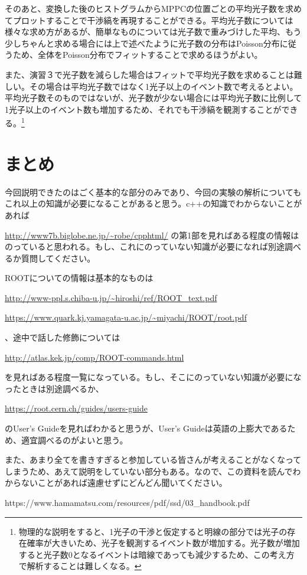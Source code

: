 \documentclass[uplatex,10pt,a4j]{jsarticle}
\begin{document}
そのあと、変換した後のヒストグラムからMPPCの位置ごとの平均光子数を求めてプロットすることで干渉縞を再現することができる。平均光子数については様々な求め方があるが、簡単なものについては光子数で重みづけした平均、もう少しちゃんと求める場合には上で述べたように光子数の分布はPoisson分布に従うため、全体をPoisson分布でフィットすることで求めるほうがよい。

また、演習３で光子数を減らした場合はフィットで平均光子数を求めることは難しい。その場合は平均光子数ではなく1光子以上のイベント数で考えるとよい。平均光子数そのものではないが、光子数が少ない場合には平均光子数に比例して1光子以上のイベント数も増加するため、それでも干渉縞を観測することができる。\footnote{物理的な説明をすると、1光子の干渉と仮定すると明線の部分では光子の存在確率が大きいため、光子を観測するイベント数が増加する。光子数が増加すると光子数0となるイベントは暗線であっても減少するため、この考え方で解析することは難しくなる。}

\section{まとめ}
\label{sec:lastsection}
今回説明できたのはごく基本的な部分のみであり、今回の実験の解析についてもこれ以上の知識が必要になることがあると思う。c++の知識でわからないことがあれば

\url{http://www7b.biglobe.ne.jp/~robe/cpphtml/}
の第1部を見ればある程度の情報はのっていると思われる。もし、これにのっていない知識が必要になれば別途調べるか質問してください。

ROOTについての情報は基本的なものは

\url{http://www-ppl.s.chiba-u.jp/~hiroshi/ref/ROOT_text.pdf}

\url{https://www.quark.kj.yamagata-u.ac.jp/~miyachi/ROOT/root.pdf}

、途中で話した修飾については

\url{http://atlas.kek.jp/comp/ROOT-commands.html}

を見ればある程度一覧になっている。もし、そこにのっていない知識が必要になったときは別途調べるか、

\url{https://root.cern.ch/guides/users-guide}

のUser's Guideを見ればわかると思うが、User's Guideは英語の上膨大であるため、適宜調べるのがよいと思う。

また、あまり全てを書きすぎると参加している皆さんが考えることがなくなってしまうため、あえて説明をしていない部分もある。なので、この資料を読んでわからないことがあれば遠慮せずにどんどん聞いてください。

\begin{thebibliography}{9}
  https://www.hamamatsu.com/resources/pdf/ssd/03\_handbook.pdf
\end{thebibliography}
\end{document}
